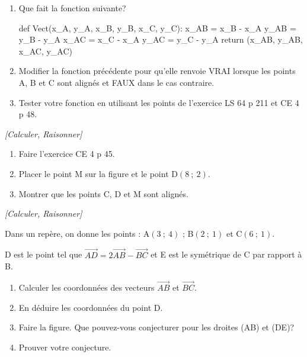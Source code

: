 \begin{enumerate}
\item Que fait la fonction suivante?

\begin{center}
\begin{minipage}{0.64\linewidth}
\begin{pythoncodenumligne}
def Vect(x_A, y_A, x_B, y_B, x_C, y_C):
    x_AB = x_B - x_A
    y_AB = y_B - y_A
    x_AC = x_C - x_A
    y_AC = y_C - y_A
    return (x_AB, y_AB, x_AC, y_AC)
\end{pythoncodenumligne}
\end{minipage}
\end{center}


\item Modifier la fonction précédente pour qu'elle renvoie VRAI lorsque les points A, B et C sont alignés et FAUX dans le cas contraire.
\item Tester votre fonction en utilisant les points de l'exercice LS 64 p 211 et CE 4 p 48.
\end{enumerate}



\exo \textit{[Calculer, Raisonner]}

\begin{enumerate}
\item Faire l'exercice CE 4 p 45.
\item Placer le point M sur la figure et le point D$(8~;~2)$.
\item Montrer que les points C, D et M sont alignés.
\end{enumerate}


\medskip

\exo \textit{[Calculer, Raisonner]}

Dans un repère, on donne les points : A$(3~;~4)$ ; B$(2~;~1)$ et C$(6~;~1)$.

D est le point tel que $\overrightarrow{AD}=2\overrightarrow{AB}-\overrightarrow{BC}$ et E est le symétrique de C par rapport à B.

\begin{enumerate}
\item Calculer les coordonnées des vecteurs $\overrightarrow{AB}$ et $\overrightarrow{BC}$.
\item En déduire les coordonnées du point D.
\item Faire la figure. Que pouvez-vous conjecturer pour les droites (AB) et (DE)?
\item Prouver votre conjecture.
\end{enumerate}








